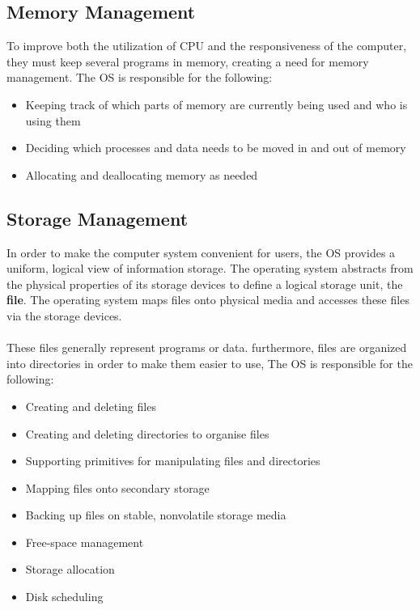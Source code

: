 \documentclass{article}
\begin{document}
\subsection{Memory Management}
To improve both the utilization of CPU and the responsiveness of the computer, they must keep several programs in memory, creating a need for memory management. The OS is responsible for the following:

\begin{itemize}
	\item Keeping track of which parts of memory are currently being used and who is using them
	\item Deciding which processes and data needs to be moved in and out of memory
	\item Allocating and deallocating memory as needed
\end{itemize}

\subsection{Storage Management}
In order to make the computer system convenient for users, the OS provides a uniform, logical view of information storage. The operating system abstracts from the physical properties of its storage devices to define a logical storage unit, the \textbf{file}. The operating system maps files onto physical media and accesses these files via the storage devices. \\ \\
These files generally represent programs or data. furthermore, files are organized into directories in order to make them easier to use, The OS is responsible for the following:

\begin{itemize}
	\item Creating and deleting files
	\item Creating and deleting directories to organise files
	\item Supporting primitives for manipulating files and directories
	\item Mapping files onto secondary storage
	\item Backing up files on stable, nonvolatile storage media
	\item Free-space management
	\item Storage allocation
	\item Disk scheduling
\end{itemize}
\end{document}
